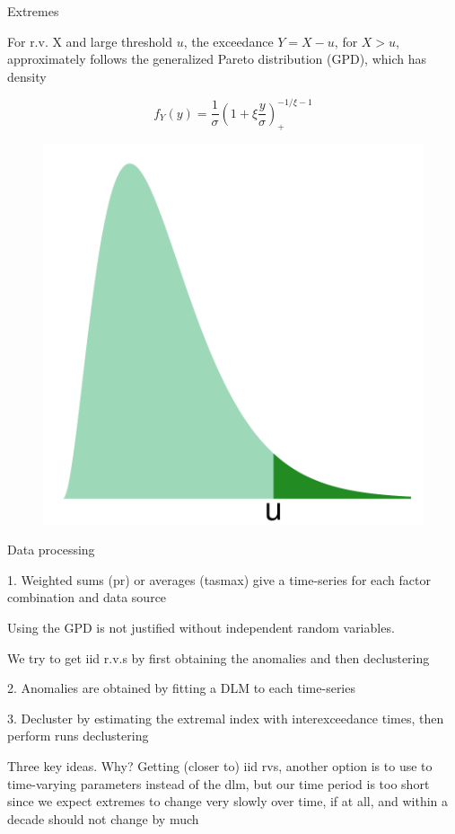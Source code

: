 \documentclass[mathserif, 11pt, t]{beamer}
\begin{document}
\begin{frame}{Extremes}

For r.v. X and large threshold $u$, the exceedance $Y=X-u$, for $X>u$, approximately follows the generalized Pareto distribution (GPD), which has density

\[ f_Y(y) = \frac{1}{\sigma}\left(1+\xi\frac{y}{\sigma}\right)_+^{-1/\xi-1} \]

\begin{figure}
\begin{center}
\includegraphics[scale=0.22]{figs/tail.pdf}
\end{center}
\end{figure}

\end{frame}



\begin{frame}{Data processing}

1. Weighted sums (pr) or averages (tasmax) give a time-series for each factor combination and data source

Using the GPD is not justified without independent random variables.

We try to get iid r.v.s by first obtaining the anomalies and then declustering

2. Anomalies are obtained by fitting a DLM to each time-series

3. Decluster by estimating the extremal index with interexceedance times, then perform runs declustering

Three key ideas. Why? Getting (closer to) iid rvs, another option is to use to time-varying parameters instead of the dlm, but our time period is too short since we expect extremes to change very slowly over time, if at all, and within a decade should not change by much

\end{frame}
\end{document}
